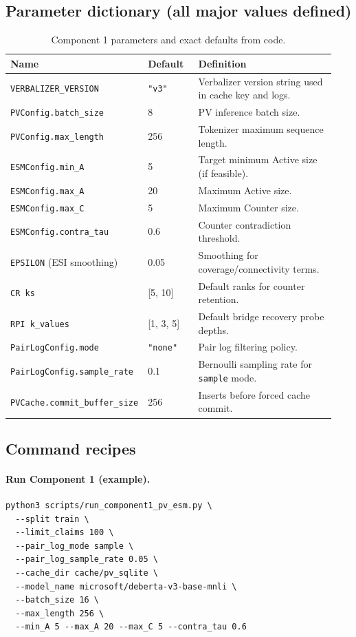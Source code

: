 \subsection{Parameter dictionary (all major values defined)}
\begin{table}[H]
\centering
\begin{tabular}{@{}p{0.24\linewidth}p{0.17\linewidth}p{0.53\linewidth}@{}}
\toprule
Name & Default & Definition \\
\midrule
\texttt{VERBALIZER\_VERSION} & \texttt{"v3"} & Verbalizer version string used in cache key and logs. \\
\texttt{PVConfig.batch\_size} & 8 & PV inference batch size. \\
\texttt{PVConfig.max\_length} & 256 & Tokenizer maximum sequence length. \\
\texttt{ESMConfig.min\_A} & 5 & Target minimum Active size (if feasible). \\
\texttt{ESMConfig.max\_A} & 20 & Maximum Active size. \\
\texttt{ESMConfig.max\_C} & 5 & Maximum Counter size. \\
\texttt{ESMConfig.contra\_tau} & 0.6 & Counter contradiction threshold. \\
\texttt{EPSILON} (ESI smoothing) & 0.05 & Smoothing for coverage/connectivity terms. \\
\texttt{CR ks} & [5, 10] & Default ranks for counter retention. \\
\texttt{RPI k\_values} & [1, 3, 5] & Default bridge recovery probe depths. \\
\texttt{PairLogConfig.mode} & \texttt{"none"} & Pair log filtering policy. \\
\texttt{PairLogConfig.sample\_rate} & 0.1 & Bernoulli sampling rate for \texttt{sample} mode. \\
\texttt{PVCache.commit\_buffer\_size} & 256 & Inserts before forced cache commit. \\
\bottomrule
\end{tabular}
\caption{Component 1 parameters and exact defaults from code.}
\label{tab:c1_parameter_dictionary}
\end{table}

\subsection{Command recipes}
\paragraph{Run Component 1 (example).}
\begin{lstlisting}[style=jsonstyle]
python3 scripts/run_component1_pv_esm.py \
  --split train \
  --limit_claims 100 \
  --pair_log_mode sample \
  --pair_log_sample_rate 0.05 \
  --cache_dir cache/pv_sqlite \
  --model_name microsoft/deberta-v3-base-mnli \
  --batch_size 16 \
  --max_length 256 \
  --min_A 5 --max_A 20 --max_C 5 --contra_tau 0.6
\end{lstlisting}


